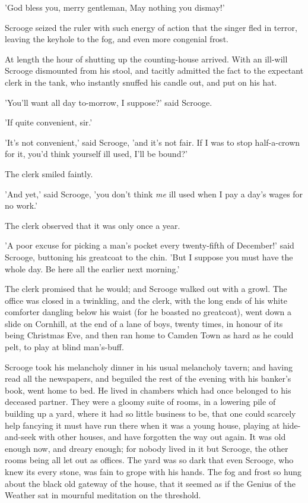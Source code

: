   'God bless you, merry gentleman,
  May nothing you dismay!'

Scrooge seized the ruler with such energy of action that the singer fled
in terror, leaving the keyhole to the fog, and even more congenial
frost.

At length the hour of shutting up the counting-house arrived. With an
ill-will Scrooge dismounted from his stool, and tacitly admitted the
fact to the expectant clerk in the tank, who instantly snuffed his
candle out, and put on his hat.

'You'll want all day to-morrow, I suppose?' said Scrooge.

'If quite convenient, sir.'

'It's not convenient,' said Scrooge, 'and it's not fair. If I was to
stop half-a-crown for it, you'd think yourself ill used, I'll be bound?'

The clerk smiled faintly.

'And yet,' said Scrooge, 'you don't think \emph{me} ill used when I pay a
day's wages for no work.'


The clerk observed that it was only once a year.

'A poor excuse for picking a man's pocket every twenty-fifth of
December!' said Scrooge, buttoning his greatcoat to the chin. 'But I
suppose you must have the whole day. Be here all the earlier next
morning.'

The clerk promised that he would; and Scrooge walked out with a growl.
The office was closed in a twinkling, and the clerk, with the long ends
of his white comforter dangling below his waist (for he boasted no
greatcoat), went down a slide on Cornhill, at the end of a lane of boys,
twenty times, in honour of its being Christmas Eve, and then ran home to
Camden Town as hard as he could pelt, to play at blind man's-buff.

Scrooge took his melancholy dinner in his usual melancholy tavern; and
having read all the newspapers, and beguiled the rest of the evening
with his banker's book, went home to bed. He lived in chambers which had
once belonged to his deceased partner. They were a gloomy suite of
rooms, in a lowering pile of building up a yard, where it had so little
business to be, that one could scarcely help fancying it must have run
there when it was a young house, playing at hide-and-seek with other
houses, and have forgotten the way out again. It was old enough now, and
dreary enough; for nobody lived in it but Scrooge, the other rooms
being all let out as offices. The yard was so dark that even Scrooge,
who knew its every stone, was fain to grope with his hands. The fog and
frost so hung about the black old gateway of the house, that it seemed
as if the Genius of the Weather sat in mournful meditation on the
threshold.

